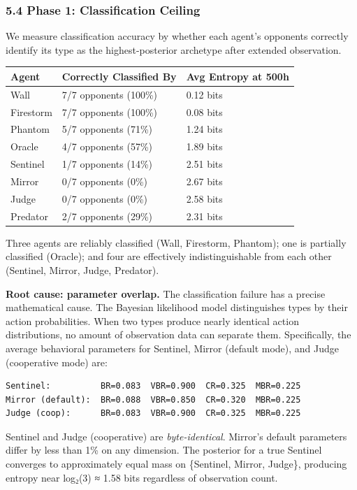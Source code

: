 \documentclass[
]{article}
\begin{document}
\hypertarget{phase-1-classification-ceiling}{%
\subsubsection{5.4 Phase 1: Classification
Ceiling}\label{phase-1-classification-ceiling}}

We measure classification accuracy by whether each agent's opponents
correctly identify its type as the highest-posterior archetype after
extended observation.

\begin{longtable}[]{@{}lll@{}}
\toprule\noalign{}
Agent & Correctly Classified By & Avg Entropy at 500h \\
\midrule\noalign{}
\endhead
\bottomrule\noalign{}
\endlastfoot
Wall & 7/7 opponents (100\%) & 0.12 bits \\
Firestorm & 7/7 opponents (100\%) & 0.08 bits \\
Phantom & 5/7 opponents (71\%) & 1.24 bits \\
Oracle & 4/7 opponents (57\%) & 1.89 bits \\
Sentinel & 1/7 opponents (14\%) & 2.51 bits \\
Mirror & 0/7 opponents (0\%) & 2.67 bits \\
Judge & 0/7 opponents (0\%) & 2.58 bits \\
Predator & 2/7 opponents (29\%) & 2.31 bits \\
\end{longtable}

Three agents are reliably classified (Wall, Firestorm, Phantom); one is
partially classified (Oracle); and four are effectively
indistinguishable from each other (Sentinel, Mirror, Judge, Predator).

\textbf{Root cause: parameter overlap.} The classification failure has a
precise mathematical cause. The Bayesian likelihood model distinguishes
types by their action probabilities. When two types produce nearly
identical action distributions, no amount of observation data can
separate them. Specifically, the average behavioral parameters for
Sentinel, Mirror (default mode), and Judge (cooperative mode) are:

\begin{verbatim}
Sentinel:          BR=0.083  VBR=0.900  CR=0.325  MBR=0.225
Mirror (default):  BR=0.088  VBR=0.850  CR=0.320  MBR=0.225
Judge (coop):      BR=0.083  VBR=0.900  CR=0.325  MBR=0.225
\end{verbatim}

Sentinel and Judge (cooperative) are \emph{byte-identical}. Mirror's
default parameters differ by less than 1\% on any dimension. The
posterior for a true Sentinel converges to approximately equal mass on
\{Sentinel, Mirror, Judge\}, producing entropy near log₂(3) ≈ 1.58 bits
regardless of observation count.
\end{document}
